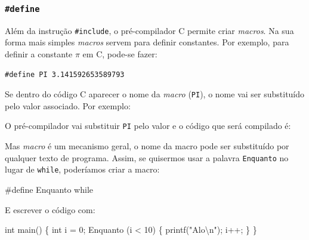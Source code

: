 \documentclass[
]{article}
\newenvironment{Shaded}{}{}
\newcommand{\DataTypeTok}[1]{\textcolor[rgb]{0.56,0.13,0.00}{#1}}
\newcommand{\DecValTok}[1]{\textcolor[rgb]{0.25,0.63,0.44}{#1}}
\newcommand{\FloatTok}[1]{\textcolor[rgb]{0.25,0.63,0.44}{#1}}
\newcommand{\NormalTok}[1]{#1}
\newcommand{\PreprocessorTok}[1]{\textcolor[rgb]{0.74,0.48,0.00}{#1}}
\newcommand{\SpecialCharTok}[1]{\textcolor[rgb]{0.25,0.44,0.63}{#1}}
\newcommand{\StringTok}[1]{\textcolor[rgb]{0.25,0.44,0.63}{#1}}
\begin{document}
\hypertarget{define}{%
\subsubsection{\texorpdfstring{\texttt{\#define}}{\#define}}\label{define}}

Além da instrução \texttt{\#include}, o pré-compilador C permite criar
\emph{macros}. Na sua forma mais simples \emph{macros} servem para
definir constantes. Por exemplo, para definir a constante \(\pi\) em C,
pode-se fazer:

\begin{verbatim}
#define PI 3.141592653589793
\end{verbatim}

Se dentro do código C aparecer o nome da \emph{macro} (\texttt{PI}), o
nome vai ser substituído pelo valor associado. Por exemplo:

\begin{Shaded}
\end{Shaded}

O pré-compilador vai substituir \texttt{PI} pelo valor e o código que
será compilado é:

\begin{Shaded}
\end{Shaded}

Mas \emph{macro} é um mecanismo geral, o nome da macro pode ser
substituído por qualquer texto de programa. Assim, se quisermos usar a
palavra \texttt{Enquanto} no lugar de \texttt{while}, poderíamos criar a
macro:

\begin{Shaded}
\begin{Highlighting}[]
\PreprocessorTok{#define Enquanto while}
\end{Highlighting}
\end{Shaded}

E escrever o código com:

\begin{Shaded}
\begin{Highlighting}[]
\DataTypeTok{int}\NormalTok{ main() \{}
  \DataTypeTok{int}\NormalTok{ i = }\DecValTok{0}\NormalTok{;}
\NormalTok{  Enquanto (i < }\DecValTok{10}\NormalTok{) \{}
\NormalTok{    printf(}\StringTok{"Alo}\SpecialCharTok{\textbackslash{}n}\StringTok{"}\NormalTok{);}
\NormalTok{    i++;}
\NormalTok{  \}}
\NormalTok{\}}
\end{Highlighting}
\end{Shaded}
\end{document}
